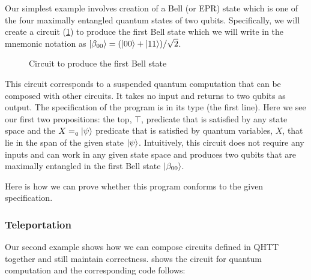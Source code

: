 \documentclass[adraft,creativecommons]{eptcs}
\begin{document}
Our simplest example involves creation of a Bell (or EPR) state which is one of the four maximally entangled quantum states of two qubits. Specifically, we will create a circuit (\cref{fig:bell00}) to produce the first Bell state which we will write in the mnemonic notation as $\ket{\beta_{00}} = (\ket{00}+\ket{11})/\sqrt{2}$.

\begin{figure}
    \centering
    \caption{Circuit to produce the first Bell state}
    \label{fig:bell00}
\end{figure}



This circuit corresponds to a suspended quantum computation that can be composed with other circuits. It takes no input and returns to two qubits as output. The specification of the program is in its type (the first line). Here we see our first two propositions: the top, $\top$, predicate that is satisfied by any state space and the $X =_q \ket{\psi}$ predicate that is satisfied by quantum variables, $X$, that lie in the span of the given state $\ket{\psi}$. Intuitively, this circuit does not require any inputs and can work in any given state space and produces two qubits that are maximally entangled in the first Bell state $\ket{\beta_{00}}$.

Here is how we can prove whether this program conforms to the given specification.



\subsubsection{Teleportation}
Our second example shows how we can compose circuits defined in QHTT together and still maintain correctness.  shows the circuit for quantum computation and the corresponding code follows:
\end{document}
